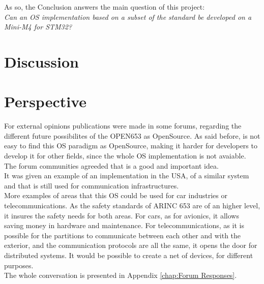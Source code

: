 As so, the Conclusion answers the main question of this project:\\
\textit{Can an OS implementation based on a subset of the \arinc{} standard be
developed on a Mini-M4 for STM32?}
\clearpage

\section{Discussion}

\section{Perspective}
For external opinions publications were made in some forums, regarding the different future possibilites of the OPEN653 as OpenSource. As said before, is not easy to find this OS paradigm as OpenSource, making it harder for developers to develop it for other fields, since the whole OS implementation is not avaiable. The forum communities agreeded that is a good and important idea.\\
It was given an example of an implementation in the USA, of a similar system and that is still used for
communication infrastructures.\\
More examples of areas that this OS could be used for car industries or telecommunications.
As the safety standards of ARINC 653 are of an higher level, it insures the safety needs for both areas. For cars, as for avionics, it allows saving money in hardware and maintenance. For telecommunications, as it is possible for the partitions to communicate between each other and with the exterior, and the communication protocols are all the same, it opens the door for distributed systems. It would be possible to create a net of devices, for different purposes.\\
The whole conversation is presented in Appendix \ref{chap:Forum Responses}.


